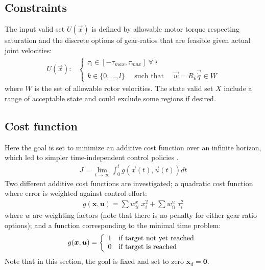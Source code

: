 \subsection{Constraints}

The input valid set $U(\vec{x})$ is defined by allowable motor torque respecting saturation and the discrete options of gear-ratios that are feasible given actual joint velocities:
\begin{align}
	U(\vec{x}):&\left\{
	\begin{array}{l}
	\tau_i \in [ -\tau_{max} , \tau_{max} ] \;\forall\; i\\
	k      \in \{ 0 , ... , l \} \quad\text{ such that }\quad \vec{w} = R_k \vec{\dot{q}} \in W
	\end{array}
	\right.
\end{align}
where $W$ is the set of allowable rotor velocities. The state valid set $X$ include a range of acceptable state and could exclude some regions if desired. 

\subsection{Cost function}
\label{sec:CostFunction}

Here the goal is set to minimize an additive cost function over an infinite horizon, which led to simpler time-independent control policies \cite{bertsekas_dynamic_2000}.
%
\begin{align}
	J = \lim_{ t \rightarrow \infty} \int_0^t g(\vec{x}(t),\vec{u}(t)) dt 
	\label{eq:j_lim}
\end{align}
%
Two different additive cost functions are investigated; a quadratic cost function where error is weighted against control effort:
%
\begin{align}
	g(\boldsymbol{x},\boldsymbol{u}) = \sum w^x_{ii} \; x_i^2 + \sum w^u_{ii} \; \tau_i^2
	\label{eq:g_quad}
\end{align}
%
where $w$ are weighting factors (note that there is no penalty for either gear ratio options); and a function corresponding to the minimal time problem:
%
\begin{align}
	g(\boldsymbol{x},\boldsymbol{u}) = \left \{ \begin{array}[pos]{l}	1 \quad   \text{if target not yet reached} \\ 0 \quad   \text{if target is reached} \end{array}  \right.
	\label{eq:g_time}
\end{align}
%
Note that in this section, the goal is fixed and set to zero $\boldsymbol{x}_d=\boldsymbol{0}$.


